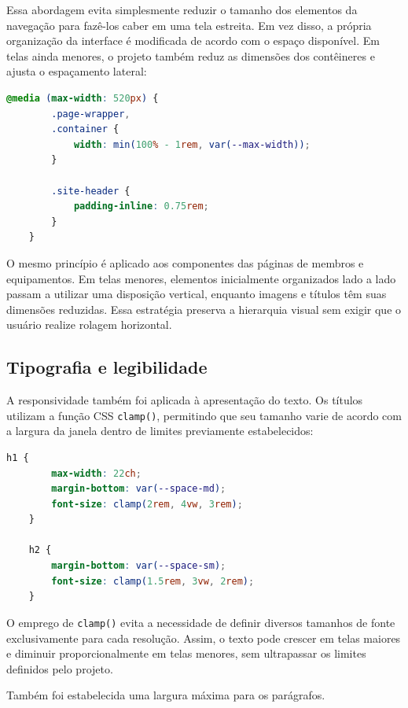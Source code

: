 Essa abordagem evita simplesmente reduzir o tamanho dos elementos da navegação para fazê-los caber em uma tela estreita. Em vez disso, a própria organização da interface é modificada de acordo com o espaço disponível. Em telas ainda menores, o projeto também reduz as dimensões dos contêineres e ajusta o espaçamento lateral:

\begin{lstlisting}[language=CSS, caption={Redução dos espaçamentos em telas muito estreitas.}, label={lst:responsive520}]
	@media (max-width: 520px) {
		.page-wrapper,
		.container {
			width: min(100% - 1rem, var(--max-width));
		}
		
		.site-header {
			padding-inline: 0.75rem;
		}
	}
\end{lstlisting}

O mesmo princípio é aplicado aos componentes das páginas de membros e equipamentos. Em telas menores, elementos inicialmente organizados lado a lado passam a utilizar uma disposição vertical, enquanto imagens e títulos têm suas dimensões reduzidas. Essa estratégia preserva a hierarquia visual sem exigir que o usuário realize rolagem horizontal.

\vspace{5mm}
\subsection{Tipografia e legibilidade}

A responsividade também foi aplicada à apresentação do texto. Os títulos utilizam a função CSS \texttt{clamp()}, permitindo que seu tamanho varie de acordo com a largura da janela dentro de limites previamente estabelecidos:

\begin{lstlisting}[language=CSS, caption={Dimensionamento adaptativo dos títulos.}, label={lst:clamp}]
	h1 {
		max-width: 22ch;
		margin-bottom: var(--space-md);
		font-size: clamp(2rem, 4vw, 3rem);
	}
	
	h2 {
		margin-bottom: var(--space-sm);
		font-size: clamp(1.5rem, 3vw, 2rem);
	}
\end{lstlisting}

O emprego de \texttt{clamp()} evita a necessidade de definir diversos tamanhos de fonte exclusivamente para cada resolução. Assim, o texto pode crescer em telas maiores e diminuir proporcionalmente em telas menores, sem ultrapassar os limites definidos pelo projeto.

Também foi estabelecida uma largura máxima para os parágrafos.


